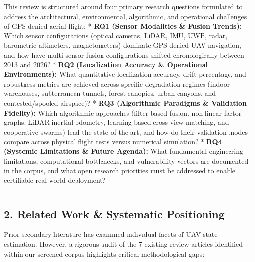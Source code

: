 \documentclass[journal]{IEEEtran}
\begin{document}
This review is structured around four primary research questions
formulated to address the architectural, environmental, algorithmic, and
operational challenges of GPS-denied aerial flight: * \textbf{RQ1
(Sensor Modalities \& Fusion Trends):} Which sensor configurations
(optical cameras, LiDAR, IMU, UWB, radar, barometric altimeters,
magnetometers) dominate GPS-denied UAV navigation, and how have
multi-sensor fusion configurations shifted chronologically between 2013
and 2026? * \textbf{RQ2 (Localization Accuracy \& Operational
Environments):} What quantitative localization accuracy, drift
percentage, and robustness metrics are achieved across specific
degradation regimes (indoor warehouses, subterranean tunnels, forest
canopies, urban canyons, and contested/spoofed airspace)? * \textbf{RQ3
(Algorithmic Paradigms \& Validation Fidelity):} Which algorithmic
approaches (filter-based fusion, non-linear factor graphs,
LiDAR-inertial odometry, learning-based cross-view matching, and
cooperative swarms) lead the state of the art, and how do their
validation modes compare across physical flight tests versus numerical
simulation? * \textbf{RQ4 (Systemic Limitations \& Future Agenda):} What
fundamental engineering limitations, computational bottlenecks, and
vulnerability vectors are documented in the corpus, and what open
research priorities must be addressed to enable certifiable real-world
deployment?

\begin{center}\rule{0.5\linewidth}{0.5pt}\end{center}

\subsection{2. Related Work \& Systematic
Positioning}\label{related-work-systematic-positioning}

Prior secondary literature has examined individual facets of UAV state
estimation. However, a rigorous audit of the 7 existing review articles
identified within our screened corpus highlights critical methodological
gaps:
\end{document}
